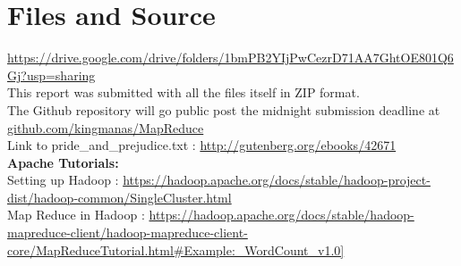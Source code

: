 \documentclass[10pt]{report}
\begin{document}
\inputminted[frame=lines]{python}{plot.py}

\section{Files and Source}

\url{https://drive.google.com/drive/folders/1bmPB2YIjPwCezrD71AA7GhtOE801Q6Gj?usp=sharing} \\

This report was submitted with all the files itself in ZIP format. \\

The Github repository will go public post the midnight submission deadline at \href{https://github.com/kingmanas/MapReduce}{github.com/kingmanas/MapReduce} \\

Link to pride\_and\_prejudice.txt : \url{http://gutenberg.org/ebooks/42671} \\

\textbf{Apache Tutorials:} \\

Setting up Hadoop : \url{https://hadoop.apache.org/docs/stable/hadoop-project-dist/hadoop-common/SingleCluster.html} \\
Map Reduce in Hadoop : \url{https://hadoop.apache.org/docs/stable/hadoop-mapreduce-client/hadoop-mapreduce-client-core/MapReduceTutorial.html#Example:_WordCount_v1.0]} \\
\end{document}
